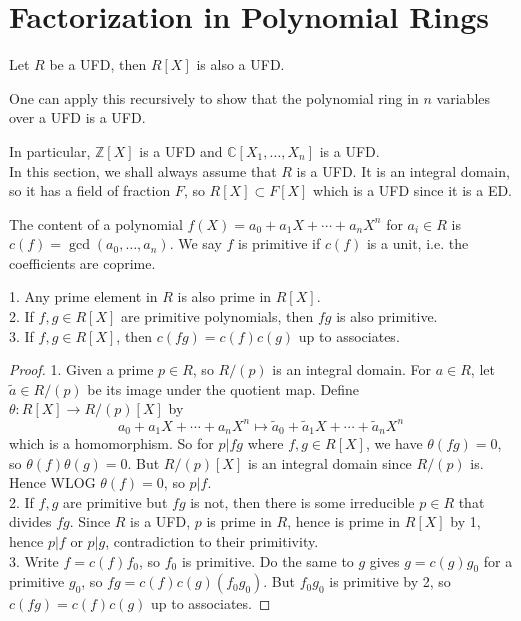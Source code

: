 \section{Factorization in Polynomial Rings}
\begin{theorem}\label{ufd_poly}
    Let $R$ be a UFD, then $R[X]$ is also a UFD.
\end{theorem}
\begin{remark}
    One can apply this recursively to show that the polynomial ring in $n$ variables over a UFD is a UFD.
\end{remark}
In particular, $\mathbb Z[X]$ is a UFD and $\mathbb C[X_1,\ldots,X_n]$ is a UFD.\\
In this section, we shall always assume that $R$ is a UFD.
It is an integral domain, so it has a field of fraction $F$, so $R[X]\subset F[X]$ which is a UFD since it is a ED.
\begin{definition}
    The content of a polynomial $f(X)=a_0+a_1X+\cdots+a_nX^n$ for $a_i\in R$ is $c(f)=\gcd(a_0,\ldots,a_n)$.
    We say $f$ is primitive if $c(f)$ is a unit, i.e. the coefficients are coprime.
\end{definition}
\begin{lemma}\label{poly_content}
    1. Any prime element in $R$ is also prime in $R[X]$.\\
    2. If $f,g\in R[X]$ are primitive polynomials, then $fg$ is also primitive.\\
    3. If $f,g\in R[X]$, then $c(fg)=c(f)c(g)$ up to associates.
\end{lemma}
\begin{proof}
    1. Given a prime $p\in R$, so $R/(p)$ is an integral domain.
    For $a\in R$, let $\tilde{a}\in R/(p)$ be its image under the quotient map.
    Define $\theta:R[X]\to R/(p)[X]$ by
    $$a_0+a_1X+\cdots+a_nX^n\mapsto \tilde{a}_0+\tilde{a}_1X+\cdots+\tilde{a}_nX^n$$
    which is a homomorphism.
    So for $p|fg$ where $f,g\in R[X]$, we have $\theta(fg)=0$, so $\theta(f)\theta(g)=0$.
    But $R/(p)[X]$ is an integral domain since $R/(p)$ is.
    Hence WLOG $\theta(f)=0$, so $p|f$.\\
    2. If $f,g$ are primitive but $fg$ is not, then there is some irreducible $p\in R$ that divides $fg$.
    Since $R$ is a UFD, $p$ is prime in $R$, hence is prime in $R[X]$ by 1, hence $p|f$ or $p|g$, contradiction to their primitivity.\\
    3. Write $f=c(f)f_0$, so $f_0$ is primitive.
    Do the same to $g$ gives $g=c(g)g_0$ for a primitive $g_0$, so $fg=c(f)c(g)(f_0g_0)$.
    But $f_0g_0$ is primitive by 2, so $c(fg)=c(f)c(g)$ up to associates.
\end{proof}
